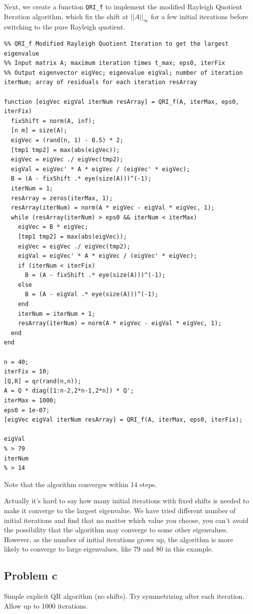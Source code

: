 \documentclass[12pt,oneside,a4paper]{article}
\newcommand{\subproblem}[1]
{
    \subsection*{Problem {#1}}
}
\newcommand{\m}[1]{\texttt{{#1}}}
\begin{document}
Next, we create a function \m{QRI\_f} to implement the modified Rayleigh Quotient Iteration algorithm, which fix the shift at $||A||_{\infty}$ for a few initial iterations before switching to the pure Rayleigh quotient.
\begin{lstlisting}
%% QRI_f Modified Rayleigh Quotient Iteration to get the largest eigenvalue
%% Input matrix A; maximum iteration times t_max; eps0, iterFix
%% Output eigenvector eigVec; eigenvalue eigVal; number of iteration iterNum; array of residuals for each iteration resArray

function [eigVec eigVal iterNum resArray] = QRI_f(A, iterMax, eps0, iterFix)
  fixShift = norm(A, inf);
  [n m] = size(A);
  eigVec = (rand(n, 1) - 0.5) * 2;
  [tmp1 tmp2] = max(abs(eigVec));
  eigVec = eigVec ./ eigVec(tmp2);
  eigVal = eigVec' * A * eigVec / (eigVec' * eigVec);
  B = (A - fixShift .* eye(size(A)))^(-1);
  iterNum = 1;
  resArray = zeros(iterMax, 1);
  resArray(iterNum) = norm(A * eigVec - eigVal * eigVec, 1);
  while (resArray(iterNum) > eps0 && iterNum < iterMax)
    eigVec = B * eigVec;
    [tmp1 tmp2] = max(abs(eigVec));
    eigVec = eigVec ./ eigVec(tmp2);
    eigVal = eigVec' * A * eigVec / (eigVec' * eigVec);
    if (iterNum < iterFix)
      B = (A - fixShift .* eye(size(A)))^(-1);
    else
      B = (A - eigVal .* eye(size(A)))^(-1);
    end
    iterNum = iterNum + 1;
    resArray(iterNum) = norm(A * eigVec - eigVal * eigVec, 1);
  end
end

n = 40;
iterFix = 10;
[Q,R] = qr(rand(n,n));
A = Q * diag([1:n-2,2*n-1,2*n]) * Q';
iterMax = 1000;
eps0 = 1e-07;
[eigVec eigVal iterNum resArray] = QRI_f(A, iterMax, eps0, iterFix);

eigVal
% > 79
iterNum
% > 14
\end{lstlisting}

Note that the algorithm converges within 14 steps.

Actually it's hard to say how many initial iterations with fixed shifts is needed to make it converge to the largest eigenvalue. We have tried different number of initial iterations and find that no matter which value you choose, you can't avoid the possibility that the algorithm may converge to some other eigenvalues. However, as the number of initial iterations grows up, the algorithm is more likely to converge to large eigenvalues, like 79 and 80 in this example.

\subproblem{c}
Simple explicit QR algorithm (no shifts). Try symmetrizing after each iteration. Allow up to 1000 iterations.
\end{document}
